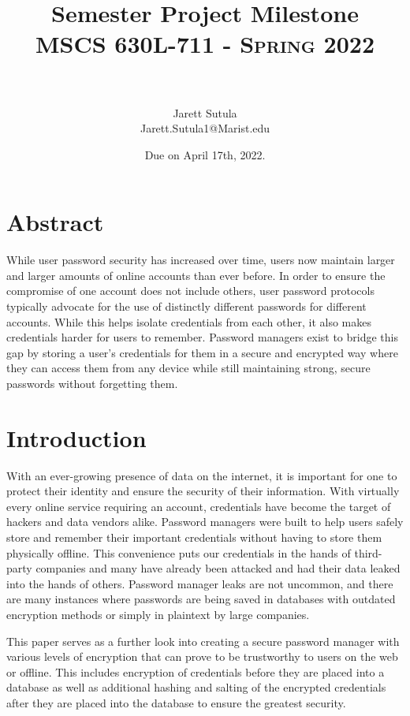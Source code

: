 \documentclass{article}
\title{	
   \huge Semester Project Milestone  \\     	    %
   \normalfont \normalsize
   \textsc{MSCS 630L-711 - Spring 2022} \\[10pt] %
   \horrule{0.5pt} \\[0.25cm] 	%
}
\author{Jarett Sutula \\ \normalsize Jarett.Sutula1@Marist.edu}
\date{Due on April 17th, 2022.} 	%
\numberwithin{equation}{section} %
\numberwithin{figure}{section} %
\numberwithin{table}{section} %
\begin{document}
\maketitle %

\section{Abstract}
While user password security has increased over time, users now maintain larger and larger amounts of online accounts than ever before. In order to ensure the compromise of one account does not include others, user password protocols typically advocate for the use of distinctly different passwords for different accounts. While this helps isolate credentials from each other, it also makes credentials harder for users to remember. Password managers exist to bridge this gap by storing a user's credentials for them in a secure and encrypted way where they can access them from any device while still maintaining strong, secure passwords without forgetting them.

\section{Introduction}
With an ever-growing presence of data on the internet, it is important for one to protect their identity and ensure the security of their information. With virtually every online service requiring an account, credentials have become the target of hackers and data vendors alike. Password managers were built to help users safely store and remember their important credentials without having to store them physically offline. This convenience puts our credentials in the hands of third-party companies and many have already been attacked and had their data leaked into the hands of others. Password manager leaks are not uncommon, and there are many instances where passwords are being saved in databases with outdated encryption methods or simply in plaintext by large companies.

This paper serves as a further look into creating a secure password manager with various levels of encryption that can prove to be trustworthy to users on the web or offline. This includes encryption of credentials before they are placed into a database as well as additional hashing and salting of the encrypted credentials after they are placed into the database to ensure the greatest security.
\end{document}
